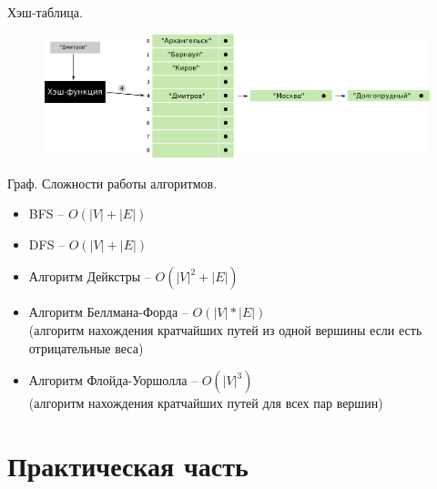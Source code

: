\documentclass[10pt]{beamer}
\begin{document}
\begin{frame}{Хэш-таблица.}
\begin{figure}
\centerline{\includegraphics[width=0.99\linewidth]{images/hash_9.png}}
\end{figure}
\end{frame}



\begin{frame}{Граф. Сложности работы алгоритмов.}
\begin{itemize}
\item BFS -- $O(|V| + |E|)$
\item DFS -- $O(|V| + |E|)$
\item Алгоритм Дейкстры -- $O(|V|^2 + |E|)$
\item Алгоритм Беллмана-Форда -- $O(|V|*|E|)$ \\
(алгоритм нахождения кратчайших путей из одной вершины если есть отрицательные веса)
\item Алгоритм Флойда-Уоршолла -- $O(|V|^3)$ \\
(алгоритм нахождения кратчайших путей для всех пар вершин)
\end{itemize}
\end{frame}



\section{Практическая часть}
\end{document}
